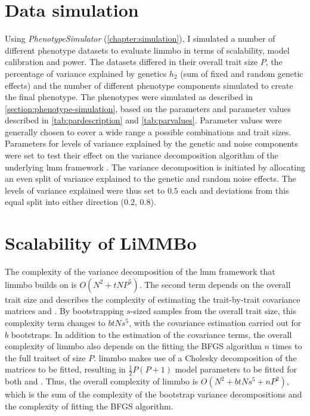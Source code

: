 \section{Data simulation}
\label{section:data-limmbo}
Using \textit{PhenotypeSimulator} (\cref{chapter:simulation}), I simulated a number of different phenotype datasets to evaluate \gls{limmbo} in terms of scalability, model calibration and power. The datasets differed in their overall trait size \(P\), the percentage of variance explained by genetics \(h_2\) (sum of fixed and random genetic effects) and the number of different phenotype components simulated to create the final phenotype. The phenotypes were simulated as described in \cref{section:phenotype-simulation}, based on the parameters and parameter values described in \cref{tab:pardescription} and \cref{tab:parvalues}. Parameter values were generally chosen to cover a wide range a possible combinations and trait sizes. Parameters for levels of variance explained by the genetic and noise components were set to test their effect on the variance decomposition algorithm of the underlying \gls{lmm} framework \citep{Casale2015}. The variance decomposition is initiated by allocating an even split of variance explained to the genetic and random noise effects. The levels of variance explained were thus set to \(0.5\) each and deviations from this equal split into either direction (\(0.2\), \(0.8\)). 
%

\section{Scalability of LiMMBo}
\label{section:scalability-limmbo}
The complexity of the variance decomposition of the \gls{lmm} framework that \gls{limmbo} builds on is \(O(N^2 + tNP^5)\). The second term depends on the overall trait size and describes the complexity of estimating the trait-by-trait covariance matrices   and  . By bootstrapping \(s\)-sized samples from the overall trait size, this complexity term changes to \(btNs^5\), with the covariance estimation carried out for \(b\) bootstraps. In addition to the estimation of the covariance terms, the overall complexity of \gls{limmbo} also depends on the fitting the BFGS algorithm \(n\) times to the full traitset of size \(P\). \gls{limmbo} makes use of a Cholesky decomposition of the matrices to be fitted, resulting in $\frac{1}{2}P(P+1)$ model parameters to be fitted for both   and  . Thus, the overall complexity of \gls{limmbo} is \(O(N^2 + btNs^5 + nP^2)\), which is the sum of the complexity of the bootstrap variance decompositions and the complexity of fitting the BFGS algorithm.  

